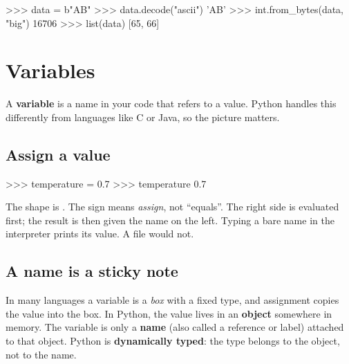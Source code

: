 \begin{pycode}
>>> data = b"AB"
>>> data.decode("ascii")
'AB'
>>> int.from_bytes(data, "big")
16706
>>> list(data)
[65, 66]
\end{pycode}

\section{Variables}

A \textbf{variable} is a name in your code that refers to a value. Python handles this
differently from languages like C or Java, so the picture matters.

\subsection{Assign a value}

\begin{pycode}
>>> temperature = 0.7
>>> temperature
0.7
\end{pycode}

The shape is . The \code{=} sign means \emph{assign}, not ``equals''.
The right side is evaluated first; the result is then given the name on the left.
Typing a bare name in the interpreter prints its value. A file would not.

\subsection{A name is a sticky note}

In many languages a variable is a \emph{box} with a fixed type, and assignment copies the
value into the box. In Python, the value lives in an \textbf{object} somewhere in memory.
The variable is only a \textbf{name} (also called a reference or label) attached to that object.
Python is \textbf{dynamically typed}: the type belongs to the object, not to the name.

%
\begin{center}
\end{center}


